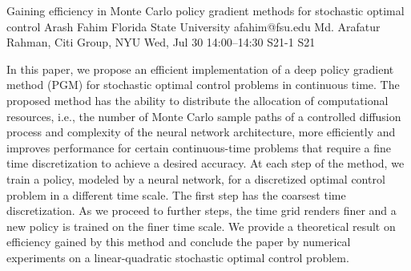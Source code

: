 \begin{talk}
  {Gaining efficiency in Monte Carlo policy gradient methods for stochastic optimal control}%
  {Arash Fahim}%
  {Florida State University}%
  {afahim@fsu.edu}%
  {Md. Arafatur Rahman, Citi Group, NYU}%
  {}%
  {Wed, Jul 30 14:00–14:30}%
  {S21-1}%
  {S21}%
  
				
			
In this paper, we propose an efficient implementation of a deep policy gradient method (PGM) for stochastic optimal control problems in continuous time. The proposed method has the ability to distribute the allocation of computational resources, i.e., the number of Monte Carlo  sample paths of a controlled diffusion process and complexity of the neural network architecture, more efficiently and improves performance for certain continuous-time problems that require a fine time discretization to achieve a desired accuracy. At each step of the method, we train a policy, modeled by a neural network, for a discretized optimal control problem in a different time scale. The first step has the coarsest time discretization. As we proceed to further steps, the time grid renders finer and a new policy is trained on the finer time scale. We provide a theoretical result on efficiency gained by this method and conclude the paper by numerical experiments on a linear-quadratic stochastic optimal control problem.

\medskip


\end{talk}


